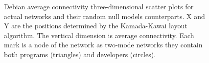 \begin{figure}[p]
\hspace{.01in}

\caption[Debian average connectivity three-dimensional scatter plots.]{Debian average connectivity three-dimensional scatter plots for actual networks and their random null models counterparts. X and Y are the positions determined by the Kamada-Kawai layout algorithm. The vertical dimension is average connectivity. Each mark is a node of the network as two-mode networks they contain both programs (triangles) and developers (circles).}
\label{fig:debian-s3d}
\end{figure}

